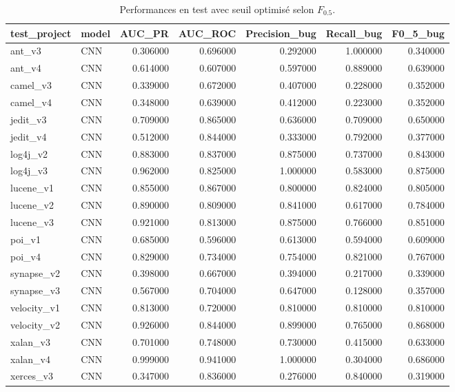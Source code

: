 \begin{table}
\caption{Performances en test avec seuil optimisé selon $F_{0.5}$.}
\label{tab:results_f05}
\begin{tabular}{llrrrrr}
\toprule
test_project & model & AUC_PR & AUC_ROC & Precision_bug & Recall_bug & F0_5_bug \\
\midrule
ant_v3 & CNN & 0.306000 & 0.696000 & 0.292000 & 1.000000 & 0.340000 \\
ant_v4 & CNN & 0.614000 & 0.607000 & 0.597000 & 0.889000 & 0.639000 \\
camel_v3 & CNN & 0.339000 & 0.672000 & 0.407000 & 0.228000 & 0.352000 \\
camel_v4 & CNN & 0.348000 & 0.639000 & 0.412000 & 0.223000 & 0.352000 \\
jedit_v3 & CNN & 0.709000 & 0.865000 & 0.636000 & 0.709000 & 0.650000 \\
jedit_v4 & CNN & 0.512000 & 0.844000 & 0.333000 & 0.792000 & 0.377000 \\
log4j_v2 & CNN & 0.883000 & 0.837000 & 0.875000 & 0.737000 & 0.843000 \\
log4j_v3 & CNN & 0.962000 & 0.825000 & 1.000000 & 0.583000 & 0.875000 \\
lucene_v1 & CNN & 0.855000 & 0.867000 & 0.800000 & 0.824000 & 0.805000 \\
lucene_v2 & CNN & 0.890000 & 0.809000 & 0.841000 & 0.617000 & 0.784000 \\
lucene_v3 & CNN & 0.921000 & 0.813000 & 0.875000 & 0.766000 & 0.851000 \\
poi_v1 & CNN & 0.685000 & 0.596000 & 0.613000 & 0.594000 & 0.609000 \\
poi_v4 & CNN & 0.829000 & 0.734000 & 0.754000 & 0.821000 & 0.767000 \\
synapse_v2 & CNN & 0.398000 & 0.667000 & 0.394000 & 0.217000 & 0.339000 \\
synapse_v3 & CNN & 0.567000 & 0.704000 & 0.647000 & 0.128000 & 0.357000 \\
velocity_v1 & CNN & 0.813000 & 0.720000 & 0.810000 & 0.810000 & 0.810000 \\
velocity_v2 & CNN & 0.926000 & 0.844000 & 0.899000 & 0.765000 & 0.868000 \\
xalan_v3 & CNN & 0.701000 & 0.748000 & 0.730000 & 0.415000 & 0.633000 \\
xalan_v4 & CNN & 0.999000 & 0.941000 & 1.000000 & 0.304000 & 0.686000 \\
xerces_v3 & CNN & 0.347000 & 0.836000 & 0.276000 & 0.840000 & 0.319000 \\

\end{tabular}
\end{table}

